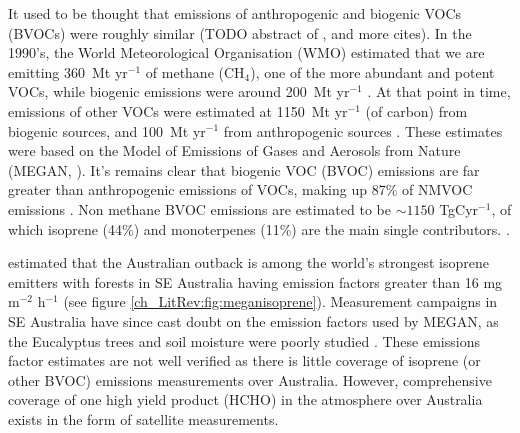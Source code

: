     It used to be thought that emissions of anthropogenic and biogenic VOCs (BVOCs) were roughly similar (TODO abstract of \citep{Mueller1992}, and more cites).
    In the 1990's, the World Meteorological Organisation (WMO) estimated that we are emitting 360~Mt yr$^{-1}$ of methane (CH$_4$), one of the more abundant and potent VOCs, while biogenic emissions were around 200~Mt yr$^{-1}$ \citep{Atkinson2000}.
    At that point in time, emissions of other VOCs were estimated at 1150~Mt yr$^{-1}$ (of carbon) from biogenic sources, and 100~Mt yr$^{-1}$ from anthropogenic sources \citep{Guenther1995, Atkinson2000}.
    These estimates were based on the Model of Emissions of Gases and Aerosols from Nature (MEGAN, \citet{Guenther1995}).
    It's remains clear that biogenic VOC (BVOC) emissions are far greater than anthropogenic emissions of VOCs, making up 87\% of NMVOC emissions \citep{Kanakidou2005, Kefauver2014}.
    Non methane BVOC emissions are estimated to be $\sim1150$ TgCyr$^{-1}$, of which isoprene (44\%) and monoterpenes (11\%) are the main single contributors. \citep{Guenther2000, Kefauver2014}. 
    
    \citet{Guenther2006} estimated that the Australian outback is among the world's strongest isoprene emitters with forests in SE Australia having emission factors greater than 16 mg m$^{-2}$ h$^{-1}$ (see figure \ref{ch_LitRev:fig:meganisoprene}).
    Measurement campaigns in SE Australia have since cast doubt on the emission factors used by MEGAN, as the Eucalyptus trees and soil moisture were poorly studied \cite{Emmerson2016}.
    These emissions factor estimates are not well verified as there is little coverage of isoprene (or other BVOC) emissions measurements over Australia.
    However, comprehensive coverage of one high yield product (HCHO) in the atmosphere over Australia exists in the form of satellite measurements.
    
